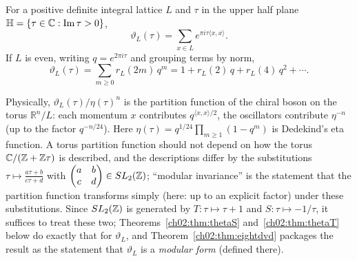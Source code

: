 \begin{definition}\label{ch02:def:theta}
For a positive definite integral lattice $L$ and $\tau$ in the upper half plane
$\mathbb{H}=\{\tau\in{\mathbb{C}}:\operatorname{Im}\tau>0\}$,
\begin{equation*}
\vartheta_L(\tau)=\sum_{x\in L}e^{\pi i\tau\langle x,x\rangle}.
\end{equation*}
If $L$ is even, writing $q=e^{2\pi i\tau}$ and grouping terms by norm,
\begin{equation}\label{ch02:eq:qexp}
\vartheta_L(\tau)=\sum_{m\ge0}r_L(2m)\,q^m=1+r_L(2)\,q+r_L(4)\,q^2+\cdots .
\end{equation}
\end{definition}
Physically, $\vartheta_L(\tau)/\eta(\tau)^n$ is the partition function of the chiral boson on the
torus $\mathbb{R}^n/L$: each momentum $x$ contributes $q^{\langle x,x\rangle/2}$, the oscillators
contribute $\eta^{-n}$ (up to the factor $q^{-n/24}$).  Here
$\eta(\tau)=q^{1/24}\prod_{m\ge1}(1-q^m)$ is Dedekind's eta function.  A torus partition function
should not depend on how the torus ${\mathbb{C}}/({\mathbb{Z}}+{\mathbb{Z}}\tau)$ is described, and the descriptions differ by
the substitutions $\tau\mapsto\frac{a\tau+b}{c\tau+d}$ with $\begin{pmatrix}a&b\\c&d\end{pmatrix}\in
SL_2({\mathbb{Z}})$; ``modular invariance'' is the statement that the partition function transforms
simply (here: up to an explicit factor) under these substitutions.  Since $SL_2({\mathbb{Z}})$ is generated
by $T:\tau\mapsto\tau+1$ and $S:\tau\mapsto-1/\tau$, it suffices to treat these two;
Theorems~\ref{ch02:thm:thetaS} and~\ref{ch02:thm:thetaT} below do exactly that for
$\vartheta_L$, and Theorem~\ref{ch02:thm:eightdvd} packages the result as the statement that
$\vartheta_L$ is a \emph{modular form} (defined there).

